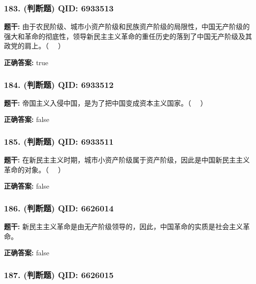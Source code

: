 \documentclass[12pt,UTF8]{ctexart}
\begin{document}
\subsubsection*{183. (判断题) \small QID: 6933513}

\textbf{题干:}
由于农民阶级、城市小资产阶级和民族资产阶级的局限性，中国无产阶级的强大和革命的彻底性，领导新民主主义革命的重任历史的落到了中国无产阶级及其政党的肩上。（   ）

\textbf{正确答案:}
true

\vspace{0.3em}\hrulefill\vspace{0.7em}

\subsubsection*{184. (判断题) \small QID: 6933512}

\textbf{题干:}
帝国主义入侵中国，是为了把中国变成资本主义国家。（   ）

\textbf{正确答案:}
false

\vspace{0.3em}\hrulefill\vspace{0.7em}

\subsubsection*{185. (判断题) \small QID: 6933511}

\textbf{题干:}
在新民主主义时期，城市小资产阶级属于资产阶级，因此是中国新民主主义革命的对象。（   ）

\textbf{正确答案:}
false

\vspace{0.3em}\hrulefill\vspace{0.7em}

\subsubsection*{186. (判断题) \small QID: 6626014}

\textbf{题干:}
新民主主义革命是由无产阶级领导的，因此，中国革命的实质是社会主义革命。

\textbf{正确答案:}
false

\vspace{0.3em}\hrulefill\vspace{0.7em}

\subsubsection*{187. (判断题) \small QID: 6626015}
\end{document}
